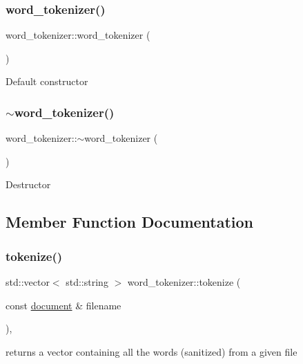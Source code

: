 \subsubsection{\texorpdfstring{word\+\_\+tokenizer()}{word\_tokenizer()}}
{\footnotesize\ttfamily word\+\_\+tokenizer\+::word\+\_\+tokenizer (\begin{DoxyParamCaption}{ }\end{DoxyParamCaption})}

Default constructor \mbox{\label{classword__tokenizer_a19a17890aac719ba8cb1459713f5a96e}} 
\subsubsection{\texorpdfstring{$\sim$word\+\_\+tokenizer()}{~word\_tokenizer()}}
{\footnotesize\ttfamily word\+\_\+tokenizer\+::$\sim$word\+\_\+tokenizer (\begin{DoxyParamCaption}{ }\end{DoxyParamCaption})}

Destructor 

\subsection{Member Function Documentation}
\mbox{\label{classword__tokenizer_ac51f61652880447073e16fdb0f471fbe}} 
\subsubsection{\texorpdfstring{tokenize()}{tokenize()}}
{\footnotesize\ttfamily std\+::vector$<$ std\+::string $>$ word\+\_\+tokenizer\+::tokenize (\begin{DoxyParamCaption}\item[{const \hyperlink{classdocument}{document} \&}]{filename }\end{DoxyParamCaption})\hspace{0.3cm}{\ttfamily [override]}, {\ttfamily [virtual]}}

returns a vector containing all the words (sanitized) from a given file 

